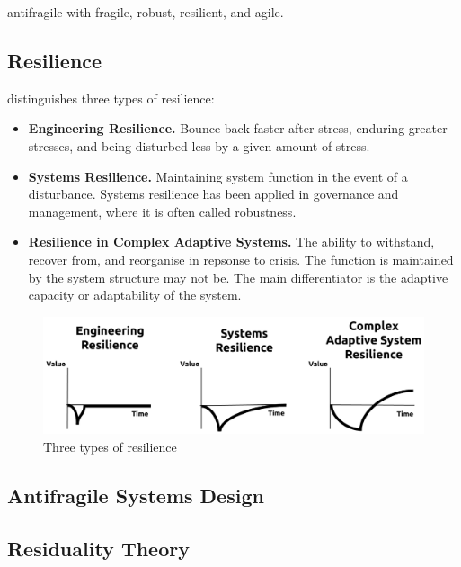 \gls{antifragile} with \gls{fragile}, \gls{robust}, \gls{resilient}, and \gls{agile}.

\subsection{Resilience}
\label{sub:tbresilience}
\textcite[p. 5-7]{MartinBreen2011} distinguishes three types of resilience:
\begin{itemize}
	\item{\textbf{Engineering Resilience.} Bounce back faster after stress, enduring greater stresses, and being disturbed less by a given amount of stress.}
	\item{\textbf{Systems Resilience.} Maintaining system function in the event of a disturbance. Systems resilience has been applied in governance and management, where it is often called robustness.}
	\item{\textbf{Resilience in Complex Adaptive Systems.} The ability to withstand, recover from, and reorganise in repsonse to crisis. The function is maintained by the system structure may not be. The main differentiator is the adaptive capacity or adaptability of the system.}
\end{itemize}

\begin{figure}[h!]
	\centering
	\includegraphics[width=0.7\linewidth]{images/eaal-martin-breen}
	\caption[Three types of resilience]{Three types of resilience \parencite{Botjes2020}}
	\label{fig:eaal-martin-breen}
\end{figure}




\subsection{Antifragile Systems Design}
\label{sub:backgroundasd}



\subsection{Residuality Theory}
\label{sub:residualitytheory}



